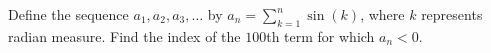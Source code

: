 Define the sequence $a_1,a_2,a_3,\ldots$ by $a_n=\sum_{k=1}^n\sin(k)$,  where $k$ represents radian measure. Find the index of the $100$th term for which $a_n<0$.